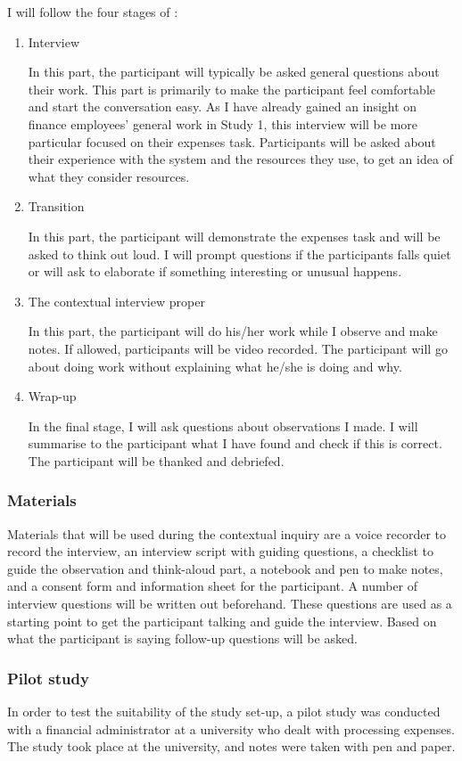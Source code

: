 \documentclass[11pt,oneside]{report}
\begin{document}
I will follow the four stages of \citet{Beyer1998}:
\begin{enumerate}
\item 
Interview

In this part, the participant will typically be asked general questions about their work. This part is primarily to make the participant feel comfortable and start the conversation easy. As I have already gained an insight on finance employees' general work in Study 1, this interview will be more particular focused on their expenses task. Participants will be asked about their experience with the system  and the resources they use, to get an idea of what they consider resources.
\item 
Transition

In this part, the participant will demonstrate the expenses task and will be asked to think out loud. I will prompt questions if the participants falls quiet or will ask to elaborate if something interesting or unusual happens.
\item 
The contextual interview proper

In this part, the participant will do his/her work while I observe and make notes. If allowed, participants will be video recorded. The participant will go about doing work without explaining what he/she is doing and why. 
\item 
Wrap-up

In the final stage, I will ask questions about observations I made. I will summarise to the participant what I have found and check if this is correct. The participant will be thanked and debriefed.
\end{enumerate}

\subsubsection{Materials}
Materials that will be used during the contextual inquiry are a voice recorder to record the interview, an interview script with guiding questions, a checklist to guide the observation and think-aloud part, a notebook and pen to make notes, and a consent form and information sheet for the participant.
A number of interview questions will be written out beforehand. These questions are used as a starting point to get the participant talking and guide the interview. Based on what the participant is saying follow-up questions will be asked. 

\subsubsection{Pilot study}
In order to test the suitability of the study set-up, a pilot study was conducted with a financial administrator at a university who dealt with processing expenses. The study took place at the university, and notes were taken with pen and paper. 
\end{document}
